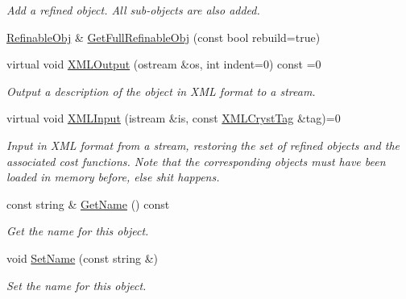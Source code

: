 \begin{DoxyCompactItemize}
\begin{DoxyCompactList}\small\item\em Add a refined object. All sub-\/objects are also added. \end{DoxyCompactList}\item 
\mbox{\hyperlink{class_obj_cryst_1_1_refinable_obj}{Refinable\+Obj}} \& \mbox{\hyperlink{class_obj_cryst_1_1_optimization_obj_a2d88b0c8d3440cddc77f57d548420e24}{Get\+Full\+Refinable\+Obj}} (const bool rebuild=true)
\item 
virtual void \mbox{\hyperlink{class_obj_cryst_1_1_optimization_obj_a6b7726159bb0d5dad1c7eebaee78f53a}{X\+M\+L\+Output}} (ostream \&os, int indent=0) const =0
\begin{DoxyCompactList}\small\item\em Output a description of the object in X\+ML format to a stream. \end{DoxyCompactList}\item 
virtual void \mbox{\hyperlink{class_obj_cryst_1_1_optimization_obj_aa07aee60f56780e2c56fb20f4a5f48a8}{X\+M\+L\+Input}} (istream \&is, const \mbox{\hyperlink{class_obj_cryst_1_1_x_m_l_cryst_tag}{X\+M\+L\+Cryst\+Tag}} \&tag)=0
\begin{DoxyCompactList}\small\item\em Input in X\+ML format from a stream, restoring the set of refined objects and the associated cost functions. Note that the corresponding objects must have been loaded in memory before, else shit happens. \end{DoxyCompactList}\item 
\mbox{\label{class_obj_cryst_1_1_optimization_obj_ad9ecef3dfab776689e20fec12e6cbe38}} 
const string \& \mbox{\hyperlink{class_obj_cryst_1_1_optimization_obj_ad9ecef3dfab776689e20fec12e6cbe38}{Get\+Name}} () const
\begin{DoxyCompactList}\small\item\em Get the name for this object. \end{DoxyCompactList}\item 
\mbox{\label{class_obj_cryst_1_1_optimization_obj_a076dc80d878fc4ab5e5491f54642382e}} 
void \mbox{\hyperlink{class_obj_cryst_1_1_optimization_obj_a076dc80d878fc4ab5e5491f54642382e}{Set\+Name}} (const string \&)
\begin{DoxyCompactList}\small\item\em Set the name for this object. \end{DoxyCompactList}\item 

\end{DoxyCompactItemize}
